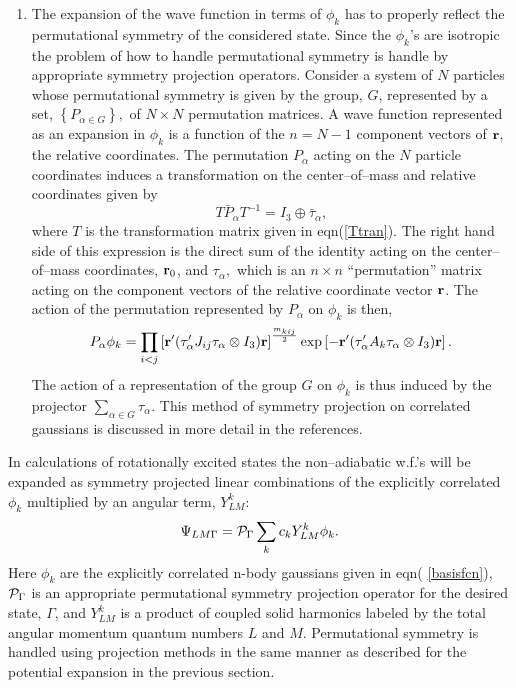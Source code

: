 {{\begin{enumerate}
\item  
The expansion of the wave function in terms
of $\phi_k$ has to properly
reflect the permutational symmetry
of the considered state. 
Since the $\phi _k$'s are isotropic
the problem of 
how to handle
permutational symmetry is
handle by appropriate symmetry projection operators. 
Consider a system
of $N$ particles  
whose permutational symmetry is given by
the group, $G$, represented by
a set, $\left\{ P_{\alpha \in G}\right\} ,$ of $N\times N$ permutation
matrices. A wave function represented as an expansion in $\phi _k$ is a
function of the $n=N-1$ component vectors of ${\bf r}$, the relative
coordinates. The permutation $P_\alpha $ acting on the $N$ particle
coordinates induces a transformation on the center--of--mass and relative
coordinates given by 
\begin{equation}
T\bar{P}_\alpha T^{-1}=I_3\oplus \bar{\tau}_\alpha,
\end{equation}
where $T$ is the transformation matrix given in eqn(\ref{Ttran}). 
The right hand side of this 
expression is the direct sum of the identity acting on the
center--of--mass coordinates, ${\bf r}_0$, and $\tau _\alpha ,$ which is an 
$n\times n$ ``permutation'' matrix acting on the component vectors of the
relative coordinate vector ${\bf r}$. The action of the permutation
represented by $P_\alpha $ on $\phi _k$ is then, 
\begin{equation}
P_\alpha \phi _k=\prod_{i<j}\left[ {\bf r}^{\prime }(\tau _\alpha
^{\prime }J_{ij}\tau _\alpha \otimes I_3){\bf r}\right] ^{\frac{m_{kij}}%
2}\exp \left[ -{\bf r}^{\prime }(\tau _\alpha ^{\prime }A_k\tau _\alpha
\otimes I_3){\bf r}\right] .
\end{equation}
The action of a representation of the group $G$ on $\phi
_k$ is thus induced by the projector $\sum_{\alpha \in G}\tau _\alpha .$
This method of symmetry 
projection on correlated gaussians is discussed in
more detail in the 
references\cite{Kinghorn93,Kinghorn95b,Poshusta83}.


\end{enumerate}


In calculations of rotationally excited states
the non--adiabatic w.f.'s will be
expanded as symmetry projected linear combinations of the explicitly
correlated $\phi _k$ multiplied by an angular term, $Y_{LM}^k:$ 
\begin{equation}
\Psi_{LM\Gamma }={\cal P}_\Gamma \sum_k c_k Y_{LM}^k\phi_k.  \label{wf}
\label{Y1}
\end{equation}
Here $\phi_k$ are the explicitly correlated n-body gaussians given 
in eqn(%
\ref{basisfcn}), ${\cal P}_\Gamma $ is an appropriate permutational
symmetry projection operator for the desired state, 
$\Gamma $, and $Y_{LM}^k$
is a product of coupled solid harmonics labeled by the total angular
momentum quantum numbers $L$ and $M$.
Permutational symmetry is handled using projection methods in the same
manner as described for the potential expansion in the previous section.

}}
